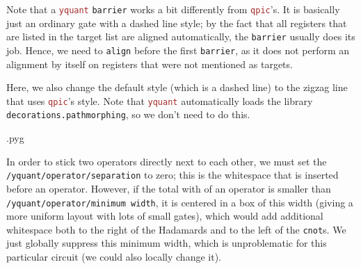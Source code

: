 \documentclass{scrartcl}
\makeatletter
\newenvironment{codeexample}{%
   \VerbatimEnvironment%
   \let\FVB@VerbatimOut\minted@FVB@VerbatimOut
   \let\FVE@VerbatimOut\minted@FVE@VerbatimOut
   \minted@configlang{tex}%
   \minted@fvset
   \begin{VerbatimOut}[codes={\catcode`\^^I=12},firstline,lastline]{\minted@jobname.pyg}%
}{
   \end{VerbatimOut}%
   \minted@langlinenoson%
   \savebox\codeexamplebox{ \minted@jobname.pyg}%
   \ifdim\wd\codeexamplebox>\dimexpr.5\linewidth-3mm\relax%
      \wd\codeexamplebox=.5\linewidth%
   \else%
      \wd\codeexamplebox=\dimexpr\wd\codeexamplebox+3mm\relax%
   \fi%
   \noindent\begin{minipage}{\wd\codeexamplebox}%
      \centering%
      \usebox\codeexamplebox%
   \end{minipage}%
   \begin{minipage}{\dimexpr\linewidth-\wd\codeexamplebox\relax}%
      \expandafter\minted@pygmentize\expandafter{\minted@lang}%
   \end{minipage}%
   \minted@langlinenosoff%
   \par%
}
\newenvironment{codeexample*}{%
   \VerbatimEnvironment%
   \let\FVB@VerbatimOut\minted@FVB@VerbatimOut
   \let\FVE@VerbatimOut\minted@FVE@VerbatimOut
   \minted@configlang{tex}%
   \minted@fvset
   \begin{VerbatimOut}[codes={\catcode`\^^I=12},firstline,lastline]{\minted@jobname.pyg}%
}{
   \end{VerbatimOut}%
   \minted@langlinenoson%
   \begin{adjustbox}{center}
       \minted@jobname.pyg %
   \end{adjustbox}\nopagebreak
   \expandafter\minted@pygmentize\expandafter{\minted@lang}%
   \minted@langlinenosoff%
   \par%
}
\def\pkg#1{\textcolor{brown}{\texttt{#1}}}
\def\ttlink{\link\texttt}
\def\Yquant{\pkg{yquant}}
\makeatother
\begin{document}
            \begin{example}
               \begin{codeexample*}
               \end{codeexample*}
               Note that a \Yquant{} \ttlink{barrier} works a bit differently from \pkg{qpic}'s.
               It is basically just an ordinary gate with a dashed line style; by the fact that all registers that are listed in the target list are aligned automatically, the \ttlink{barrier} usually does its job.
               Hence, we need to \ttlink{align} before the first \ttlink{barrier}, as it does not perform an alignment by itself on registers that were not mentioned as targets.

               Here, we also change the default style (which is a dashed line) to the zigzag line that uses \pkg{qpic}'s style.
               Note that \Yquant{} automatically loads the library \texttt{decorations.pathmorphing}, so we don't need to do this.
            \end{example}

            \begin{example}
               \begin{codeexample}
               \end{codeexample}
               In order to stick two operators directly next to each other, we must set the \ttlink{/yquant/operator/separation} to zero; this is the whitespace that is inserted before an operator.
               However, if the total with of an operator is smaller than \ttlink{/yquant/operator/minimum width}, it is centered in a box of this width (giving a more uniform layout with lots of small gates), which would add additional whitespace both to the right of the Hadamards and to the left of the \ttlink{cnot}s.
               We just globally suppress this minimum width, which is unproblematic for this particular circuit (we could also locally change it).
            \end{example}
\end{document}
